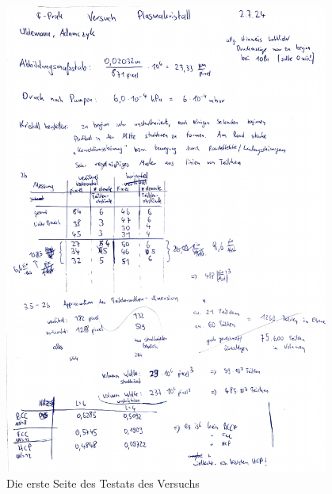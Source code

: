 \documentclass[12pt,a4paper,ngerman]{report}
\begin{document}
\begin{figure}[ht]
	\centering
	\includegraphics[width=0.95\textwidth, page=1]{data/Testat_Plasmakristall.pdf}		
	\caption[Testat 1]{Die erste Seite des Testats des Versuchs}
	\label{fig:Testat}
\end{figure}
\end{document}
